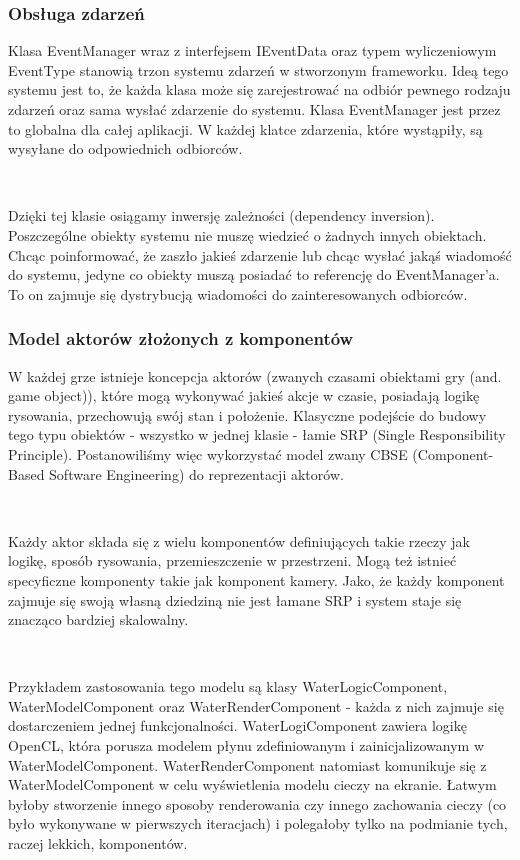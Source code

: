 \documentclass[polish, 12pt]{aghthesis}
\begin{document}
		\subsubsection{Obsługa zdarzeń}
			Klasa EventManager wraz z interfejsem IEventData oraz typem wyliczeniowym EventType stanowią trzon systemu zdarzeń w stworzonym frameworku. Ideą tego systemu jest to, że każda klasa może się zarejestrować na odbiór pewnego rodzaju zdarzeń oraz sama wysłać zdarzenie do systemu. Klasa EventManager jest przez to globalna dla całej aplikacji. W każdej klatce zdarzenia, które wystąpiły, są wysyłane do odpowiednich odbiorców.
			
			$\,$
			
			Dzięki tej klasie osiągamy inwersję zależności (dependency inversion). Poszczególne obiekty systemu nie muszę wiedzieć o żadnych innych obiektach. Chcąc poinformować, że zaszło jakieś zdarzenie lub chcąc wysłać jakąś wiadomość do systemu, jedyne co obiekty muszą posiadać to referencję do EventManager'a. To on zajmuje się dystrybucją wiadomości do zainteresowanych odbiorców.
		 
		\subsubsection{Model aktorów złożonych z komponentów}
		
			W każdej grze istnieje koncepcja aktorów (zwanych czasami obiektami gry (and. game object)), które mogą wykonywać jakieś akcje w czasie, posiadają logikę rysowania, przechowują swój stan i położenie. Klasyczne podejście do budowy tego typu obiektów - wszystko w jednej klasie - łamie SRP (Single Responsibility Principle). Postanowiliśmy więc wykorzystać model zwany CBSE (Component-Based Software Engineering) do reprezentacji aktorów. 
			
			$\,$
			
			Każdy aktor składa się z wielu komponentów definiujących takie rzeczy jak logikę, sposób rysowania, przemieszczenie w przestrzeni. Mogą też istnieć specyficzne komponenty takie jak komponent kamery. Jako, że każdy komponent zajmuje się swoją własną dziedziną nie jest łamane SRP i system staje się znacząco bardziej skalowalny. 
			
			$\,$
			
			Przykładem zastosowania tego modelu są klasy WaterLogicComponent, WaterModelComponent oraz WaterRenderComponent - każda z nich zajmuje się dostarczeniem jednej funkcjonalności. WaterLogiComponent zawiera logikę OpenCL, która porusza modelem płynu zdefiniowanym i zainicjalizowanym w WaterModelComponent. WaterRenderComponent natomiast komunikuje się z WaterModelComponent w celu wyświetlenia modelu cieczy na ekranie. Łatwym byłoby stworzenie innego sposoby renderowania czy innego zachowania cieczy (co było wykonywane w pierwszych iteracjach) i polegałoby tylko na podmianie tych, raczej lekkich, komponentów.
			
\end{document}

